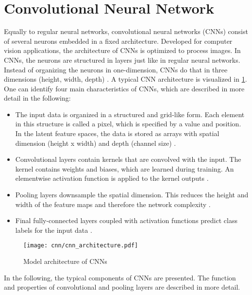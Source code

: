 \section{Convolutional Neural Network}

Equally to regular neural networks, convolutional neural networks (CNNs) consist of several neurons embedded in a fixed architecture. Developed for computer vision applications, the architecture of CNNs is optimized to process images. In CNNs, the neurons are structured in layers just like in regular neural networks. Instead of organizing the neurons in one-dimension, CNNs do that in three dimensions (height, width, depth) \cite{OShea2015}. A typical CNN architecture is visualized in \ref{fig:CNN_overview}. One can identify four main characteristics of CNNs, which are described in more detail in the following:

\begin{itemize}
    \item [1.] The input data is organized in a structured and grid-like form. Each element in this structure is called a pixel, which is specified by a value and position. In the latent feature spaces, the data is stored as arrays with spatial dimension (height x width) and depth (channel size) \cite{OShea2015}.
    
    \item [2.] Convolutional layers contain kernels that are convolved with the input. The kernel contains weights and biases, which are learned during training. An elementwise activation function is applied to the kernel outputs \cite{OShea2015}.
    
    \item [3.]  Pooling layers downsample the spatial dimension. This reduces the height and width of the feature maps and therefore the network complexity \cite{OShea2015}.
    
    \item [4.] Final fully-connected layers coupled with activation functions predict class labels for the input data \cite{OShea2015}.
\end{itemize}

\begin{figure}[H]
  \centering
  \texttt{[image: cnn/cnn\_architecture.pdf]}
  \caption {Model architecture of CNNs \cite{OShea2015}}
  \label{fig:CNN_overview}
\end{figure}

In the following, the typical components of CNNs are presented. The function and properties of convolutional and pooling layers are described in more detail.  

